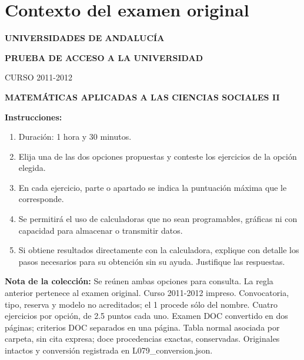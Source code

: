 \section*{Contexto del examen original}
\textbf{UNIVERSIDADES DE ANDALUCÍA}\par
\textbf{PRUEBA DE ACCESO A LA UNIVERSIDAD}\par
CURSO 2011-2012\par
\textbf{MATEMÁTICAS APLICADAS A LAS CIENCIAS SOCIALES II}

\textbf{Instrucciones:}
\begin{enumerate}[label=\textbf{\alph*)}]
  \item Duración: 1 hora y 30 minutos.
  \item Elija una de las dos opciones propuestas y conteste los ejercicios de la opción elegida.
  \item En cada ejercicio, parte o apartado se indica la puntuación máxima que le corresponde.
  \item Se permitirá el uso de calculadoras que no sean programables, gráficas ni con capacidad para almacenar o transmitir datos.
  \item Si obtiene resultados directamente con la calculadora, explique con detalle los pasos necesarios para su obtención sin su ayuda. Justifique las respuestas.
\end{enumerate}
\noindent\textbf{Nota de la colección:} Se reúnen ambas opciones para consulta. La regla anterior pertenece al examen original. Curso 2011-2012 impreso. Convocatoria, tipo, reserva y modelo no acreditados; el 1 procede sólo del nombre. Cuatro ejercicios por opción, de 2.5 puntos cada uno. Examen DOC convertido en dos páginas; criterios DOC separados en una página. Tabla normal asociada por carpeta, sin cita expresa; doce procedencias exactas, conservadas. Originales intactos y conversión registrada en L079\_conversion.json.
\par\medskip
